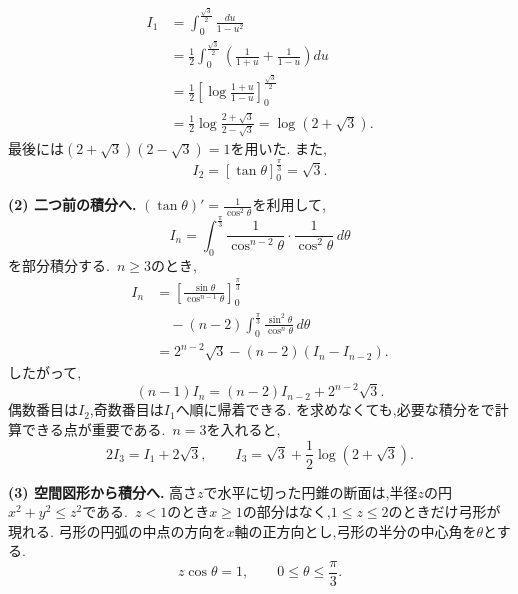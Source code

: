 \begin{enumerate}[label=\textbf{問\arabic*.},leftmargin=3.8em,format=\bookitemlink{practice-entrance}{solution}{problem}]
\[\begin{aligned}
                 I_1&=\int_0^{\frac{\sqrt3}{2}}\frac{du}{1-u^2}\\
                 &=\frac12\int_0^{\frac{\sqrt3}{2}}
                       \left(\frac1{1+u}+\frac1{1-u}\right)du\\
                 &=\frac12\left[\log\frac{1+u}{1-u}\right]_0^{\frac{\sqrt3}{2}}\\
                 &=\frac12\log\frac{2+\sqrt3}{2-\sqrt3}
                 =\log(2+\sqrt3).
                 \end{aligned}
                \]
                最後には$(2+\sqrt3)(2-\sqrt3)=1$を用いた.
                また,
                \[
                 I_2=[\tan\theta]_0^{\frac{\pi}{3}}=\sqrt3.
                \]
                \par\noindent
\textbf{(2) 二つ前の積分へ.}
                $\displaystyle (\tan\theta)'=\frac{1}{\cos^2\theta}$を利用して,
                \[
                 I_n=\int_0^{\frac{\pi}{3}}
                      \frac1{\cos^{n-2}\theta}\cdot\frac1{\cos^2\theta}\,d\theta
                \]
                を部分積分する.
                \,$n\geq3$のとき,
                \[
                 \begin{aligned}
                 I_n
                 &=\left[\frac{\sin\theta}{\cos^{n-1}\theta}\right]_0^{\frac{\pi}{3}}\\
                 &\quad -(n-2)\int_0^{\frac{\pi}{3}}
                           \frac{\sin^2\theta}{\cos^n\theta}\,d\theta\\
                 &=2^{n-2}\sqrt3-(n-2)(I_n-I_{n-2}).
                 \end{aligned}
                \]
                したがって,
                \[
                 (n-1)I_n=(n-2)I_{n-2}+2^{n-2}\sqrt3.
                \]
                偶数番目は$I_2$,奇数番目は$I_1$へ順に帰着できる.
                を求めなくても,必要な積分をで計算できる点が重要である.
                \,$n=3$を入れると,
                \[
                 2I_3=I_1+2\sqrt3,
                 \qquad
                 I_3=\sqrt3+\frac12\log(2+\sqrt3).
                \]
                \par\noindent
                \textbf{(3) 空間図形から積分へ.}
                高さ$z$で水平に切った円錐の断面は,半径$z$の円$x^2+y^2\leq z^2$である.
                \,$z<1$のとき$x\geq1$の部分はなく,$1\leq z\leq2$のときだけ弓形が現れる.
                弓形の円弧の中点の方向を$x$軸の正方向とし,弓形の半分の中心角を$\theta$とする.
                \[
                 z\cos\theta=1,\qquad 0\leq\theta\leq\frac\pi3.
\]
\end{enumerate}
